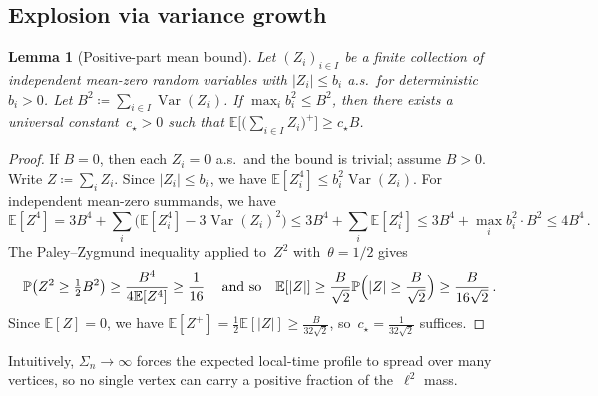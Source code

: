 \documentclass[11pt]{amsart}
\theoremstyle{plain}
\newtheorem{lemma}[theorem]{Lemma}
\theoremstyle{definition}
\newcommand{\E}{\mathbb{E}}
\renewcommand{\P}{\mathbb{P}}
\DeclareMathOperator{\var}{Var}
\begin{document}
	\subsection{Explosion via variance growth}
	
	\begin{lemma}[Positive-part mean bound]\label{lem:positive-part}
		Let $(Z_i)_{i\in I}$ be a finite collection of independent mean-zero random variables
		with $|Z_i|\leq b_i$ a.s.\ for deterministic $b_i>0$.
		Let $B^2\coloneqq\sum_{i\in I}\var(Z_i)$.
		If $\max_{i}b_i^2\leq B^2$, then there exists a universal constant~$c_\star>0$ such that $\E\bigl[\bigl(\sum_{i\in I}Z_i\bigr)^{\!+}\bigr]\geq c_\star B$.
	\end{lemma}
	\begin{proof}
		If $B=0$, then each $Z_i=0$ a.s.\ and the bound is trivial; assume $B>0$.
		Write $Z\coloneqq\sum_i Z_i$.
		Since $|Z_i|\leq b_i$, we have $\E[Z_i^4]\leq b_i^2\var(Z_i)$.
		For independent mean-zero summands, we have
		\[
		\E[Z^4]=3B^4+\sum_i\bigl(\E[Z_i^4]-3\var(Z_i)^2\bigr)\leq 3B^4+\sum_i\E[Z_i^4]\leq 3B^4+\max_i b_i^2\cdot B^2\leq 4B^4\,.
		\]
		The Paley--Zygmund inequality applied to~$Z^2$ with~$\theta=1/2$ gives
		\[
		\P\bigl(Z^2\geq\tfrac{1}{2}B^2\bigr)
		\geq\frac{B^4}{4\E[Z^4]}
		\geq\frac{1}{16}\,
		\quad 
		\text{and so} 
		\quad 
		\E[|Z|]\geq\frac{B}{\sqrt{2}}\P\Bigl(|Z|\geq\frac{B}{\sqrt{2}}\Bigr)\geq\frac{B}{16\sqrt{2}}\,.
		\]
		Since $\E[Z]=0$, we have $\E[Z^+]=\tfrac{1}{2}\E[|Z|]\geq\frac{B}{32\sqrt{2}}$, so~$c_\star=\frac{1}{32\sqrt{2}}$ suffices.
	\end{proof}
	
	Intuitively, $\Sigma_n\to\infty$ forces the expected local-time profile to spread over many vertices, so no single vertex can carry a positive fraction of the~$\ell^2$ mass.
	
\end{document}
